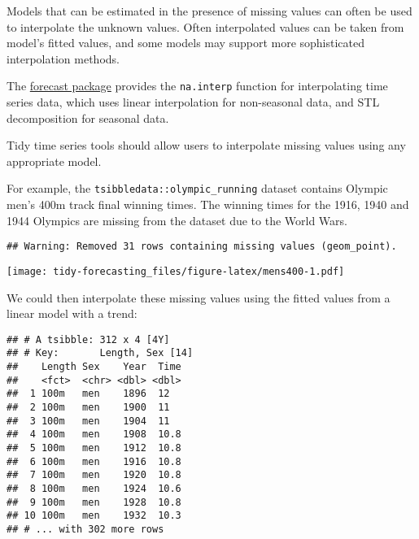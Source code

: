 \documentclass[]{book}
\newenvironment{Shaded}{\begin{snugshade}}{\end{snugshade}}
\newcommand{\DataTypeTok}[1]{\textcolor[rgb]{0.13,0.29,0.53}{#1}}
\newcommand{\KeywordTok}[1]{\textcolor[rgb]{0.13,0.29,0.53}{\textbf{#1}}}
\newcommand{\NormalTok}[1]{#1}
\newcommand{\OperatorTok}[1]{\textcolor[rgb]{0.81,0.36,0.00}{\textbf{#1}}}
\newcommand{\StringTok}[1]{\textcolor[rgb]{0.31,0.60,0.02}{#1}}
\begin{document}
Models that can be estimated in the presence of missing values can often be used to interpolate the unknown values. Often interpolated values can be taken from model's fitted values, and some models may support more sophisticated interpolation methods.

The \href{https://github.com/robjhyndman/forecast/}{forecast package} provides the \texttt{na.interp} function for interpolating time series data, which uses linear interpolation for non-seasonal data, and STL decomposition for seasonal data.

Tidy time series tools should allow users to interpolate missing values using any appropriate model.

For example, the \texttt{tsibbledata::olympic\_running} dataset contains Olympic men's 400m track final winning times. The winning times for the 1916, 1940 and 1944 Olympics are missing from the dataset due to the World Wars.

\begin{verbatim}
## Warning: Removed 31 rows containing missing values (geom_point).
\end{verbatim}

\texttt{[image: tidy-forecasting\_files/figure-latex/mens400-1.pdf]}

We could then interpolate these missing values using the fitted values from a linear model with a trend:

\begin{Shaded}
\end{Shaded}

\begin{verbatim}
## # A tsibble: 312 x 4 [4Y]
## # Key:       Length, Sex [14]
##    Length Sex    Year  Time
##    <fct>  <chr> <dbl> <dbl>
##  1 100m   men    1896  12  
##  2 100m   men    1900  11  
##  3 100m   men    1904  11  
##  4 100m   men    1908  10.8
##  5 100m   men    1912  10.8
##  6 100m   men    1916  10.8
##  7 100m   men    1920  10.8
##  8 100m   men    1924  10.6
##  9 100m   men    1928  10.8
## 10 100m   men    1932  10.3
## # ... with 302 more rows
\end{verbatim}
\end{document}
